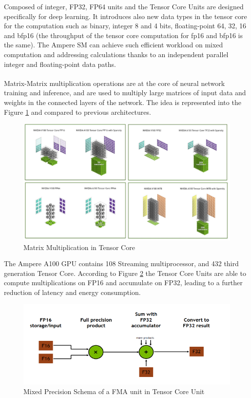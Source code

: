Composed of integer, FP32, FP64 units and the Tensor Core Units are designed specifically for deep learning. It introduces also new data types in the tensor core for the computation such as binary, integer 8 and 4 bits, floating-point 64, 32, 16 and bfp16 (the throughput of the tensor core computation for fp16 and bfp16 is the same). The Ampere SM can achieve such efficient workload on mixed computation and addressing calculations thanks to an independent parallel integer and floating-point data paths. \\\\

Matrix-Matrix multiplication operations are at the core of neural network training and inference, and are used to multiply large matrices of input data and weights in the connected layers of the network. The idea is represented into the Figure \ref{fig:tensorcorevolta} and compared to previous architectures.

\begin{figure}[!htbp]
\centering
\captionsetup{justification=centering}
\includegraphics[scale=0.6]{./figure/tensor_core.PNG}
\caption{Matrix Multiplication in Tensor Core \cite{paper:41}}
\label{fig:tensorcorevolta}
\end{figure}

The Ampere A100 GPU contains 108 Streaming multiprocessor, and 432 third generation Tensor Core.
According to Figure \ref{fig:mixprec} the Tensor Core Units are able to compute multiplications on FP16 and accumulate on FP32, leading to a further reduction of latency and energy consumption.
\begin{figure}[!htbp]
\centering
\captionsetup{justification=centering}
\includegraphics[scale=0.8]{./figure/mix_prec.PNG}
\caption{Mixed Precision Schema of a FMA unit in Tensor Core Unit \cite{paper:41}}
\label{fig:mixprec}
\end{figure}

